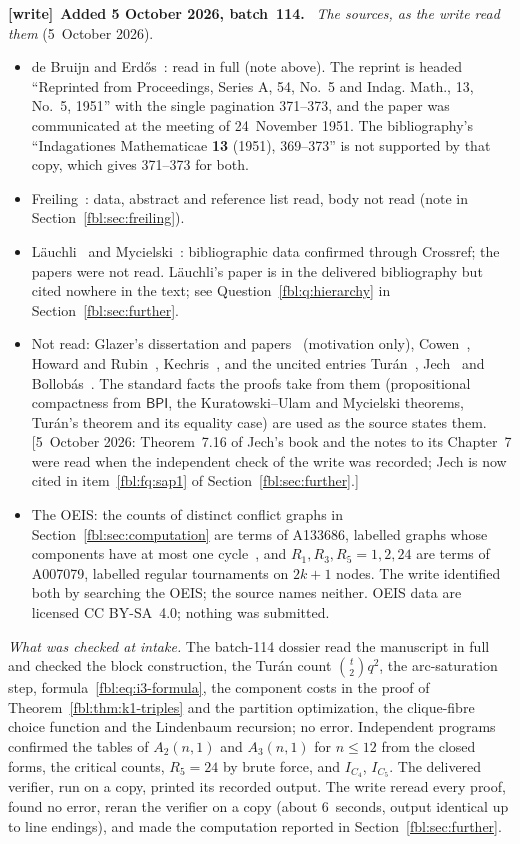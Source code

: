 \documentclass[11pt]{article}
\theoremstyle{definition}
\theoremstyle{remark}
\newcommand{\BPI}{\mathsf{BPI}}
\newenvironment{writenote}[1][]{\par\smallskip\begingroup\small
 \noindent\textbf{[write]}\if\relax\detokenize{#1}\relax\else~\textbf{#1.}\fi\ }%
 {\par\endgroup\smallskip}
\begin{document}
\begin{writenote}[Added 5 October 2026, batch~114]
\emph{The sources, as the write read them} (5~October 2026).
\begin{itemize}\raggedright
\item de Bruijn and Erd\H{o}s~\cite{deBruijnErdos}: read in full (note
 above). The reprint is headed ``Reprinted from Proceedings, Series A, 54,
 No.~5 and Indag. Math., 13, No.~5, 1951'' with the single pagination
 371--373, and the paper was communicated at the meeting of 24~November
 1951. The bibliography's ``Indagationes Mathematicae \textbf{13} (1951),
 369--373'' is not supported by that copy, which gives 371--373 for both.
\item Freiling~\cite{Freiling}: data, abstract and reference list read, body
 not read (note in Section~\ref{fbl:sec:freiling}).
\item L\"auchli~\cite{Lauchli} and Mycielski~\cite{Mycielski}: bibliographic
 data confirmed through Crossref; the papers were not read. L\"auchli's
 paper is in the delivered bibliography but cited nowhere in the text; see
 Question~\ref{fbl:q:hierarchy} in Section~\ref{fbl:sec:further}.
\item Not read: Glazer's dissertation and papers~\cite{GlazerThesis,
 GlazerBox,GlazerTennenbaum} (motivation only), Cowen~\cite{Cowen1990,
 Cowen1998}, Howard and Rubin~\cite{HowardRubin}, Kechris~\cite{Kechris},
 and the uncited entries Tur\'an~\cite{Turan}, Jech~\cite{Jech} and
 Bollob\'as~\cite{Bollobas}. The standard facts the proofs take from them
 (propositional compactness from $\BPI$, the Kuratowski--Ulam and Mycielski
 theorems, Tur\'an's theorem and its equality case) are used as the source
 states them. [5~October 2026: Theorem~7.16 of Jech's book and the notes to
 its Chapter~7 were read when the independent check of the write was
 recorded; Jech is now cited in item~\ref{fbl:fq:sap1} of
 Section~\ref{fbl:sec:further}.]
\item The OEIS: the counts of distinct conflict graphs in
 Section~\ref{fbl:sec:computation} are terms of A133686, labelled graphs
 whose components have at most one cycle~\cite{OEIS}, and
 $R_1,R_3,R_5=1,2,24$ are terms of A007079, labelled regular tournaments
 on $2k+1$ nodes. The write identified both by searching the OEIS; the
 source names neither. OEIS data are licensed CC BY-SA~4.0; nothing was
 submitted.
\end{itemize}

\emph{What was checked at intake.} The batch-114 dossier read the
manuscript in full and checked the block construction, the Tur\'an count
$\binom t2q^2$, the arc-saturation step, formula~\eqref{fbl:eq:i3-formula},
the component costs in the proof of Theorem~\ref{fbl:thm:k1-triples} and the
partition optimization, the clique-fibre choice function and the Lindenbaum
recursion; no error. Independent programs confirmed the tables of
$A_2(n,1)$ and $A_3(n,1)$ for $n\le12$ from the closed forms, the critical
counts, $R_5=24$ by brute force, and $I_{C_4}$, $I_{C_5}$. The delivered
verifier, run on a copy, printed its recorded output. The write reread every
proof, found no error, reran the verifier on a copy (about 6~seconds,
output identical up to line endings), and made the computation reported in
Section~\ref{fbl:sec:further}.


\end{writenote}
\end{document}
